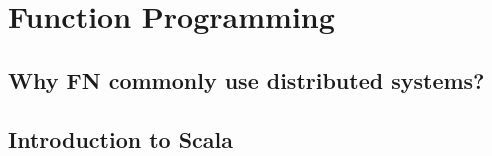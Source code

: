 \section{Function Programming}
\subsection{Why FN commonly use distributed systems?}
\subsection{Introduction to Scala}